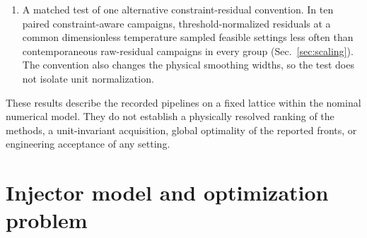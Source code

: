 \documentclass[aps,prab,reprint,superscriptaddress,amsmath,amssymb,floatfix]{revtex4-2}
\begin{document}
\begin{enumerate}
  spread, bunch length, mean energy, transmission and production-profile classifications are
  stable. A prospective re-tracking of 387 primary evaluations, sampled across methods, groups,
  feasibility states, search stages and distances to the limits, changes four
  production-profile classifications, all from infeasible to feasible, and preserves the
  feasible-sampling comparison; the emittances still differ between the two finest levels. In
  post-hoc common-shift scenarios the feasible-sampling comparison is also preserved; the
  front-quality comparisons are not tested at a converged resolution
  (Secs.~\ref{sec:problem}, \ref{sec:primary} and~\ref{sec:retracking}). A follow-up on 15 of
  the sampled settings, at up to \num{640000} particles, 64-cell grids and an eighth of the
  production step, finds the particle count converged in the median but the emittances still
  decreasing with the step at an observed order of about 1.5, with the ordering of settings
  preserved (Sec.~\ref{sec:convergence_followup}). These checks identify a
  limitation of the nominal model; they do not establish convergence.
\item A matched test of one alternative constraint-residual convention. In ten paired
  constraint-aware campaigns, threshold-normalized residuals at a common dimensionless
  temperature sampled feasible settings less often than contemporaneous raw-residual campaigns
  in every group (Sec.~\ref{sec:scaling}). The convention also changes the physical smoothing
  widths, so the test does not isolate unit normalization.
\end{enumerate}
These results describe the recorded pipelines on a fixed lattice within the nominal numerical
model. They do not establish a physically resolved ranking of the methods, a unit-invariant
acquisition, global optimality of the reported fronts, or engineering acceptance of any
setting.

\section{Injector model and optimization problem}
\label{sec:problem}
\end{document}
